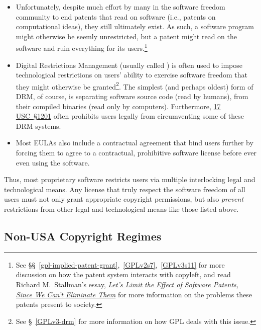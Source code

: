 \begin{itemize}

\item Unfortunately, despite much effort by many in the software freedom
  community to end patents that read on software (i.e., patents on
  computational ideas), they still ultimately exist.  As such, a software
  program might otherwise be seemly unrestricted, but a patent might read on
  the software and ruin everything for its users.\footnote{See
  \S\S~\ref{gpl-implied-patent-grant},~\ref{GPLv2s7},~\ref{GPLv3s11} for more
  discussion on how the patent system interacts with copyleft, and read
  Richard M.~Stallman's essay,
  \href{http://www.wired.com/opinion/2012/11/richard-stallman-software-patents/}{\textit{Let’s
      Limit the Effect of Software Patents, Since We Can’t Eliminate Them}}
  for more information on the problems these patents present to society.}

\item Digital Restrictions Management (usually called ) is often
  used to impose technological restrictions on users' ability to exercise
  software freedom that they might otherwise be granted\footnote{See
    \S~\ref{GPLv3-drm} for more information on how GPL deals with this issue.}.
  The simplest (and perhaps oldest) form of DRM, of course, is separating
  software source code (read by humans), from their compiled binaries (read
  only by computers).  Furthermore,
  \href{http://www.law.cornell.edu/uscode/text/17/1201}{17 USC~\S1201} often
  prohibits users legally from circumventing some of these DRM systems.

\item Most EULAs also include a contractual agreement that bind users further
  by forcing them to agree to a contractual, prohibitive software license
  before ever even using the software.

\end{itemize}

Thus, most proprietary software restricts users via multiple interlocking
legal and technological means.  Any license that truly respect the software
freedom of all users must not only grant appropriate copyright permissions,
but also \textit{prevent} restrictions from other legal and technological
means like those listed above.

\subsection{Non-USA Copyright Regimes}
\label{non-usa-copyright}

